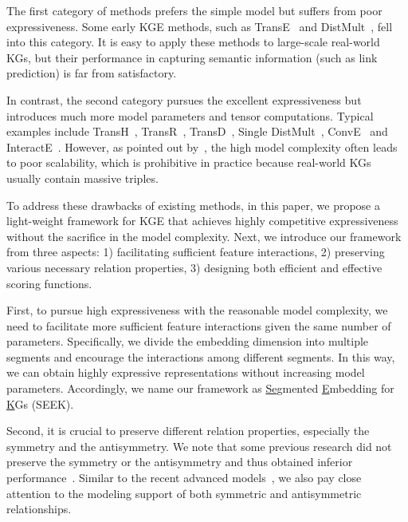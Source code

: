 \documentclass[11pt,a4paper]{article}
\begin{document}
The first category of methods prefers the simple model but suffers from poor expressiveness.
Some early KGE methods, such as TransE~\cite{bordes2013translating} and DistMult~\cite{yang2015embedding}, fell into this category.
It is easy to apply these methods to large-scale real-world KGs, but their performance in capturing semantic information (such as link prediction) is far from satisfactory.

In contrast, the second category pursues the excellent expressiveness but introduces much more model parameters and tensor computations.
Typical examples include TransH~\cite{wang2014knowledge}, TransR~\cite{lin2015learning}, TransD~\cite{ji2015knowledge}, Single DistMult~\cite{kadlec2017knowledge}, ConvE~\cite{dettmers2018conve} and InteractE~\cite{vashishth2019interacte}.
However, as pointed out by~\citet{dettmers2018conve}, the high model complexity often leads to poor scalability, which is prohibitive in practice because real-world KGs usually contain massive triples.

To address these drawbacks of existing methods, in this paper, we propose a light-weight framework for KGE that achieves highly competitive expressiveness without the sacrifice in the model complexity.
Next, we introduce our framework from three aspects: 
1) facilitating sufficient feature interactions, 
2) preserving various necessary relation properties, 
3) designing both efficient and effective scoring functions.

First, to pursue high expressiveness with the reasonable model complexity, we need to facilitate more sufficient feature interactions given the same number of parameters. 
Specifically, we divide the embedding dimension into multiple segments and encourage the interactions among different segments.
In this way, we can obtain highly expressive representations without increasing model parameters.
Accordingly, we name our framework as \underline{Se}gmented \underline{E}mbedding for \underline{K}Gs (SEEK). 

Second, it is crucial to preserve different relation properties, especially the symmetry and the antisymmetry.
We note that some previous research did not preserve the symmetry or the antisymmetry and thus obtained inferior performance~\cite{bordes2013translating,lin2015learning,yang2015embedding}.
Similar to the recent advanced models~\cite{trouillon2016complex,kazemi2018simple,sun2018rotate,DBLP:conf/acl/XuL19}, we also pay close attention to the modeling support of both symmetric and antisymmetric relationships.
\end{document}
